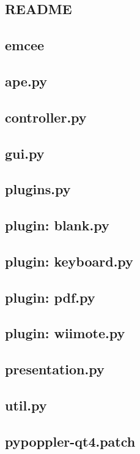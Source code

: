 \documentclass[a4paper,12pt]{article}
\begin{document}
\subsection{README}

\subsection{emcee}

\subsection{ape.py}

\subsection{controller.py}

\subsection{gui.py}

\subsection{plugins.py}

\subsection{plugin: blank.py}

\subsection{plugin: keyboard.py}

\subsection{plugin: pdf.py}

\subsection{plugin: wiimote.py}

\subsection{presentation.py}

\subsection{util.py}

\subsection{pypoppler-qt4.patch}

\end{document}
